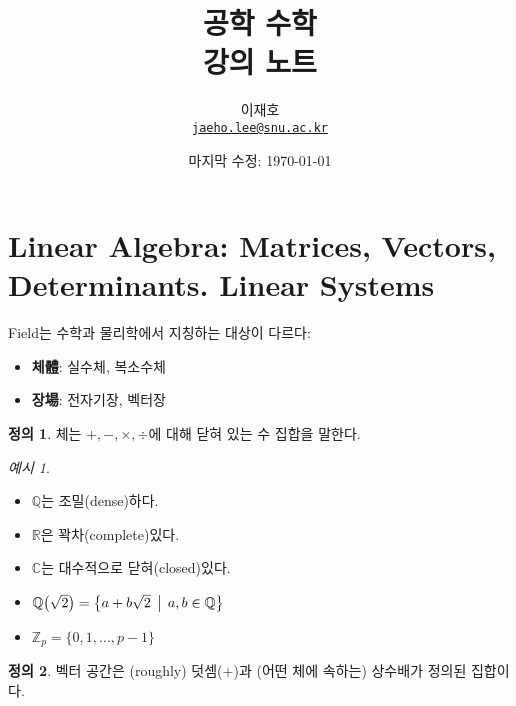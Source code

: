 \documentclass[unfonts,oneside,a4paper]{oblivoir}
\title{공학 수학\\강의 노트}
\author{이재호\\\href{mailto:jaeho.lee@snu.ac.kr}{\texttt{jaeho.lee@snu.ac.kr}}}
\date{마지막 수정: \today}
\theoremstyle{definition}
\newtheorem{definition}{정의}
\theoremstyle{theorem}
\theoremstyle{remark}
\theoremstyle{remark}
\theoremstyle{remark}
\newtheorem*{example}{예시}
\theoremstyle{remark}
\begin{document}
\maketitle

\setcounter{section}{6}
\reversemarginpar{}
\section{Linear Algebra: Matrices, Vectors, Determinants. Linear Systems}

Field는 수학과 물리학에서 지칭하는 대상이 다르다:
\begin{itemize}
    \item \textbf{체體}: 실수체, 복소수체
    \item \textbf{장場}: 전자기장, 벡터장
\end{itemize}

\begin{definition}
    체는 $+, -, \times, \div$에 대해 닫혀 있는 수 집합을 말한다.
\end{definition}

\begin{example}
    \leavevmode
    \begin{itemize}
        \item $\mathbb Q$는 조밀(dense)하다.
        \item $\mathbb R$은 꽉차(complete)있다.
        \item $\mathbb C$는 대수적으로 닫혀(closed)있다.
        \item $\mathbb Q \bigl(\sqrt 2\bigr) = \bigl\{a + b \sqrt 2\,\bigm|\,a, b \in \mathbb Q\bigr\}$
        \item $\mathbb Z_p = \{0, 1, \dots, p - 1\}$
    \end{itemize}
\end{example}

\begin{definition}
    벡터 공간은 (roughly) 덧셈($+$)과 (어떤 체에 속하는) 상수배가 정의된 집합이다.
\end{definition}
\end{document}
